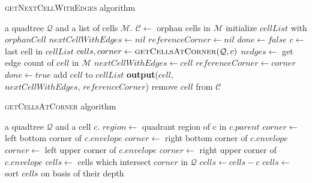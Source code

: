 \begin{algorithm}\caption{\textsc{getNextCellWithEdges} algorithm}\label{alg:one}
    \begin{algorithmic}[1]
    \Require a quadtree $\mathcal Q$ and a list of cells $\mathcal M$.
        \State $\mathcal C \gets $ orphan cells in $\mathcal M$
            \State initialize $cellList$ with $orphanCell$ 
            \State $nextCellWithEdges \gets nil$
            \State $referenceCorner \gets nil$
            \State $done \gets false$
                \State $c \gets $ last cell in $cellList$ 
                \State $cells, corner \gets \textsc{getCellsAtCorner}(\mathcal Q, c)$ 
                    \State $nedges \gets$ get edge count of $cell$ in $\mathcal M$ 
                        \State $nextCellWithEdges \gets cell$
                        \State $referenceCorner \gets corner$
                        \State $done \gets true$
                    \Else
                            \State add $cell$ to $cellList$
                        \EndIf
                    \EndIf
                \EndFor
            \EndWhile
                \State \textbf{output}($cell$, \\
                \hspace{2.5cm} $nextCellWithEdges$, $referenceCorner$)
                \State remove $cell$ from $\mathcal C$
            \EndFor
        \EndFor
    \EndFunction
    \end{algorithmic}
\end{algorithm}

\begin{algorithm} \caption{\textsc{getCellsAtCorner} algorithm}\label{alg:two}
    \begin{algorithmic}
    \Require a quadtree $\mathcal Q$ and a cell $c$.
        \State $region \gets $ quadrant region of c in $c.parent$
                \State $corner \gets$ left bottom corner of $c.envelope$
            \EndCase
                \State $corner \gets$ right bottom corner of $c.envelope$
            \EndCase
                \State $corner \gets$ left upper corner of $c.envelope$
            \EndCase
                \State $corner \gets$ right upper corner of $c.envelope$
            \EndCase
        \EndSwitch
        \State $cells \gets$ cells which intersect $corner$ in $\mathcal Q$
        \State $cells \gets cells - c$ 
        \State $cells \gets$ sort $cells$ on basis of their depth 
        \State {}
    \EndFunction
    \end{algorithmic}
\end{algorithm}

